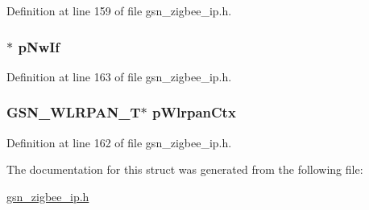 Definition at line 159 of file gsn\_\-zigbee\_\-ip.h.

\hypertarget{a00438_a162db5da6960431ec48a784907bd6fb9}{
\subsubsection[{pNwIf}]{$\ast$ {\bf pNwIf}}}
\label{a00438_a162db5da6960431ec48a784907bd6fb9}


Definition at line 163 of file gsn\_\-zigbee\_\-ip.h.

\hypertarget{a00438_accc25c6898f60fabd65c1c5dca39b804}{
\subsubsection[{pWlrpanCtx}]{\setlength{\rightskip}{0pt plus 5cm}GSN\_\-WLRPAN\_\-T$\ast$ {\bf pWlrpanCtx}}}
\label{a00438_accc25c6898f60fabd65c1c5dca39b804}


Definition at line 162 of file gsn\_\-zigbee\_\-ip.h.



The documentation for this struct was generated from the following file:\begin{DoxyCompactItemize}
\item 
\hyperlink{a00618}{gsn\_\-zigbee\_\-ip.h}\end{DoxyCompactItemize}
